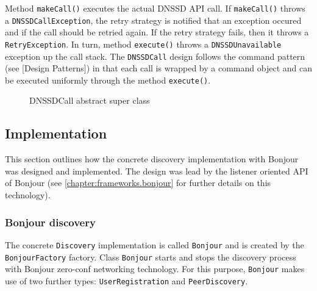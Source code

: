 Method \texttt{makeCall()} executes the actual DNSSD API call. If \texttt{makeCall()} throws a \texttt{DNSSD\-Call\-Exception}, the retry strategy is notified that an exception occured and if the call should be retried again. If the retry strategy fails, then it throws a \texttt{RetryException}. In turn, method \texttt{execute()} throws a \texttt{DNSSD\-Unavailable} exception up the call stack. 
The \texttt{DNSSDCall} design follows the command pattern (see [Design Patterns]) in that each call is wrapped by a command object and can be executed uniformly through the method \texttt{execute()}.



\begin{figure}[H]
 \centering
 \caption{DNSSDCall abstract super class}
 \label{fig:network.discovery.manager}
\end{figure}


\subsection{Implementation}
This section outlines how the concrete discovery implementation with Bonjour was designed and implemented. The design was lead by the listener oriented API of Bonjour (see \ref{chapter:frameworks.bonjour} for further details on this technology).

\subsubsection{Bonjour discovery}
The concrete \texttt{Discovery} implementation is called \texttt{Bonjour} and is created by the \texttt{BonjourFactory} factory. Class \texttt{Bonjour} starts and stops the discovery process with Bonjour zero-conf networking technology. For this purpose,  \texttt{Bonjour} makes use of two further types:  \texttt{UserRegistration} and \texttt{PeerDiscovery}.

